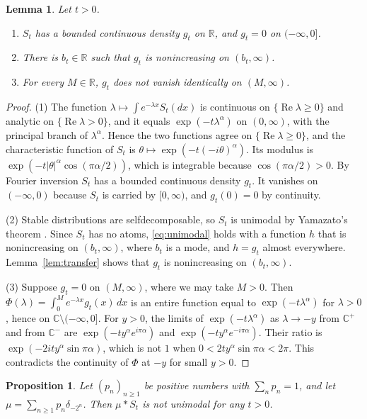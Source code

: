 \documentclass[11pt]{amsart}
\numberwithin{equation}{section}
\newtheorem{proposition}[theorem]{Proposition}
\newtheorem{lemma}[theorem]{Lemma}
\theoremstyle{definition}
\theoremstyle{remark}
\newcommand{\R}{\mathbb R}
\newcommand{\C}{\mathbb C}
\newcommand{\Cp}{\mathbb C^{+}}
\newcommand{\Cm}{\mathbb C^{-}}
\renewcommand{\Re}{\operatorname{Re}}
\begin{document}
\begin{lemma}\label{lem:kernel}
Let $t>0$.
\begin{enumerate}
\item $S_t$ has a bounded continuous density $g_t$ on $\R$, and $g_t=0$ on $(-\infty,0]$.
\item There is $b_t\in\R$ such that $g_t$ is nonincreasing on $(b_t,\infty)$.
\item For every $M\in\R$, $g_t$ does not vanish identically on $(M,\infty)$.
\end{enumerate}
\end{lemma}

\begin{proof}
(1) The function $\lambda\mapsto\int e^{-\lambda x}S_t(dx)$ is continuous on $\{\Re\lambda\ge0\}$ and analytic on $\{\Re\lambda>0\}$, and it equals $\exp(-t\lambda^\alpha)$ on $(0,\infty)$, with the principal branch of $\lambda^\alpha$. Hence the two functions agree on $\{\Re\lambda\ge0\}$, and the characteristic function of $S_t$ is $\theta\mapsto\exp(-t(-i\theta)^\alpha)$. Its modulus is $\exp(-t|\theta|^\alpha\cos(\pi\alpha/2))$, which is integrable because $\cos(\pi\alpha/2)>0$. By Fourier inversion $S_t$ has a bounded continuous density $g_t$. It vanishes on $(-\infty,0)$ because $S_t$ is carried by $[0,\infty)$, and $g_t(0)=0$ by continuity.

(2) Stable distributions are selfdecomposable, so $S_t$ is unimodal by Yamazato's theorem \cite{Yam}. Since $S_t$ has no atoms, \eqref{eq:unimodal} holds with a function $h$ that is nonincreasing on $(b_t,\infty)$, where $b_t$ is a mode, and $h=g_t$ almost everywhere. Lemma~\ref{lem:transfer} shows that $g_t$ is nonincreasing on $(b_t,\infty)$.

(3) Suppose $g_t=0$ on $(M,\infty)$, where we may take $M>0$. Then $\Phi(\lambda)=\int_0^Me^{-\lambda x}g_t(x)\,dx$ is an entire function equal to $\exp(-t\lambda^\alpha)$ for $\lambda>0$, hence on $\C\setminus(-\infty,0]$. For $y>0$, the limits of $\exp(-t\lambda^\alpha)$ as $\lambda\to-y$ from $\Cp$ and from $\Cm$ are $\exp(-ty^\alpha e^{i\pi\alpha})$ and $\exp(-ty^\alpha e^{-i\pi\alpha})$. Their ratio is $\exp(-2ity^\alpha\sin\pi\alpha)$, which is not $1$ when $0<2ty^\alpha\sin\pi\alpha<2\pi$. This contradicts the continuity of $\Phi$ at $-y$ for small $y>0$.
\end{proof}

\begin{proposition}\label{prop:atoms}
Let $(p_n)_{n\ge1}$ be positive numbers with $\sum_np_n=1$, and let $\mu=\sum_{n\ge1}p_n\delta_{-2^n}$. Then $\mu\ast S_t$ is not unimodal for any $t>0$.
\end{proposition}
\end{document}

